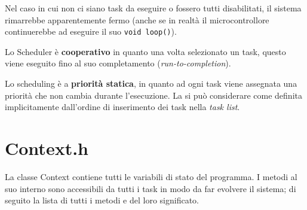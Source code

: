 Nel caso in cui non ci siano task da eseguire o fossero tutti disabilitati, il sistema rimarrebbe apparentemente fermo (anche se in realtà il microcontrollore continuerebbe ad eseguire il suo \texttt{void loop()}).

Lo Scheduler è \textbf{cooperativo} in quanto una volta selezionato un task, questo viene eseguito fino al suo completamento (\textit{run-to-completion}).

Lo scheduling è a \textbf{priorità statica}, in quanto ad ogni task viene assegnata una priorità che non cambia durante l'esecuzione. La si può considerare come definita implicitamente dall'ordine di inserimento dei task nella \textit{task list}.

\section{Context.h}\label{sec:contextimpl}
La classe Context contiene tutti le variabili di stato del programma. I metodi al suo interno sono accessibili da tutti i task in modo da far evolvere il sistema; di seguito la lista di tutti i metodi e del loro significato.
